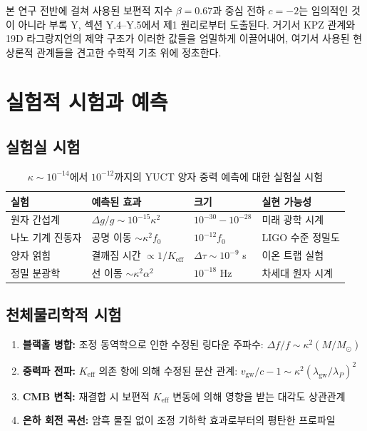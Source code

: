 \documentclass[11pt,a4paper]{article}
\theoremstyle{remark}
\newcommand{\Keff}{K_{\mathrm{eff}}}
\begin{document}
	본 연구 전반에 걸쳐 사용된 보편적 지수 $\beta = 0.67$과 중심 전하 $c = -2$는 임의적인 것이 아니라 부록 Y, 섹션 Y.4–Y.5에서 제1 원리로부터 도출된다. 거기서 KPZ 관계와 19D 라그랑지언의 제약 구조가 이러한 값들을 엄밀하게 이끌어내어, 여기서 사용된 현상론적 관계들을 견고한 수학적 기초 위에 정초한다.
	
	\section{실험적 시험과 예측}
	\label{sec:experimental-tests}
	
	\subsection{실험실 시험}
	
	\begin{table}[htbp]
		\centering
		\begin{tabular}{p{2.8cm}p{4.2cm}p{2.5cm}p{2.5cm}}
			\toprule
			\textbf{실험} & \textbf{예측된 효과} & \textbf{크기} & \textbf{실현 가능성} \\
			\midrule
			원자 간섭계 & $\Delta g/g \sim 10^{-15}\kappa^2$ & $10^{-30} - 10^{-28}$ & 미래 광학 시계 \\
			나노 기계 진동자 & 공명 이동 $\sim \kappa^2 f_0$ & $10^{-12} f_0$ & LIGO 수준 정밀도 \\
			양자 얽힘 & 결깨짐 시간 $\propto 1/\Keff$ & $\Delta\tau \sim 10^{-9}$ s & 이온 트랩 실험 \\
			정밀 분광학 & 선 이동 $\sim \kappa^2 \alpha^2$ & $10^{-18}$ Hz & 차세대 원자 시계 \\
			\bottomrule
		\end{tabular}
		\caption{$\kappa \sim 10^{-14}$에서 $10^{-12}$까지의 YUCT 양자 중력 예측에 대한 실험실 시험}
		\label{tab:lab-tests}
	\end{table}
	
	\subsection{천체물리학적 시험}
	
	\begin{enumerate}
		\item \textbf{블랙홀 병합:} 조정 동역학으로 인한 수정된 링다운 주파수: $\Delta f/f \sim \kappa^2 (M/M_\odot)$
		
		\item \textbf{중력파 전파:} $\Keff$ 의존 항에 의해 수정된 분산 관계: $v_{\text{gw}}/c - 1 \sim \kappa^2 (\lambda_{\text{gw}}/\lambda_P)^2$
		
		\item \textbf{CMB 변칙:} 재결합 시 보편적 $\Keff$ 변동에 의해 영향을 받는 대각도 상관관계
		
		\item \textbf{은하 회전 곡선:} 암흑 물질 없이 조정 기하학 효과로부터의 평탄한 프로파일
	\end{enumerate}
	
\end{document}

